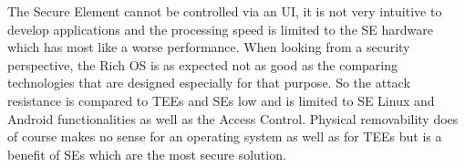 The Secure Element cannot be controlled via an UI, it is not very intuitive
to develop applications and the processing speed is limited to the SE hardware
which has most like a worse performance. When looking from a security perspective, the Rich OS is as expected not as good as the comparing technologies that are designed especially for that purpose. So the attack resistance is compared to TEEs and SEs low and is limited to SE Linux and Android functionalities as well as the Access Control. Physical removability
does of course makes no sense for an operating system as well as for TEEs but
is a benefit of SEs which are the most secure solution.





